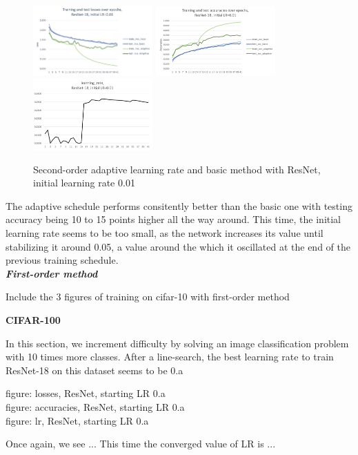 \documentclass{article}
\begin{document}
  \begin{figure}[!h]
	\includegraphics[width=130pt]{loss_resnet_0_01.png}
	\includegraphics[width=130pt]{acc_resnet_0_01.png}
	\includegraphics[width=130pt]{lr_resnet_0_01.png}
	\caption{Second-order adaptive learning rate and basic method with ResNet, initial learning rate 0.01}
\end{figure}
  
  The adaptive schedule performs consitently better than the basic one with testing accuracy being 10 to 15 points higher all the way around. This time, the initial learning rate seems to be too small, as the network increases its value until stabilizing it around 0.05, a value around the which it oscillated at the end of the previous training schedule.\\
  
  \emph{\textbf{First-order method}}
  
  Include the 3 figures of training on cifar-10 with first-order method
  
  \textbf{CIFAR-100}
  
  In this section, we increment difficulty by solving an image classification problem with 10 times more classes. After a line-search, the best learning rate to train ResNet-18 on this dataset seems to be 0.a

  figure: losses, ResNet, starting LR 0.a\\
  figure: accuracies, ResNet, starting LR 0.a\\
  figure: lr, ResNet, starting LR 0.a
  
  Once again, we see ... This time the converged value of LR is ...  
  
\end{document}
